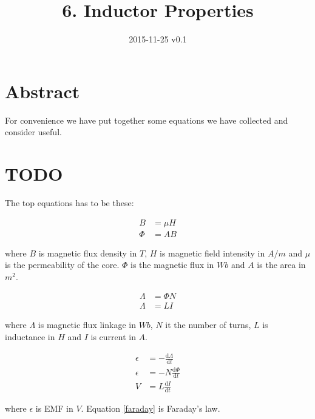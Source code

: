 \documentclass[]{../common/elementary-physics}
\title{6. Inductor Properties}
\date{2015-11-25 v0.1}
\begin{document}
\maketitle

\tableofcontents


\section{Abstract}

For convenience we have put together some equations we have collected and consider useful.

\section{TODO}

The top equations has to be these:

\begin{subequations}
\begin{align}
B &= \mu H \\
\Phi &= A B
\end{align}
\end{subequations}

where $B$ is magnetic flux density in $T$, $H$ is magnetic field intensity in $A/m$ and $\mu$ is the permeability of the core.
$\Phi$ is the magnetic flux in $Wb$ and $A$ is the area in $m^2$.

\begin{subequations}
\begin{align}
\Lambda &= \Phi N \\
\Lambda &= L I
\end{align}
\end{subequations}

where $\Lambda$ is magnetic flux linkage in $Wb$, $N$ it the number of turns, $L$ is inductance in $H$ and $I$ is current in $A$.

\begin{subequations}
\begin{align}
\epsilon &= - \frac{\mathrm{d}\Lambda}{\mathrm{d}t} \\
\epsilon &= - N \frac{\mathrm{d}\Phi}{\mathrm{d}t} \label{faraday} \\
V &= L \frac{\mathrm{d}I}{\mathrm{d}t}
\end{align}
\end{subequations}

where $\epsilon$ is EMF in $V$.
Equation \eqref{faraday} is Faraday's law.
\end{document}
